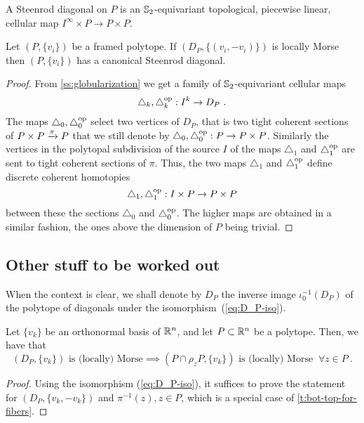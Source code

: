 \begin{definition}
	A Steenrod diagonal on $P$ is an $\mathbb{S}_2$-equivariant topological, piecewise linear, cellular map $I^\infty \times P \to P \times P$.
\end{definition}

\begin{theorem}
	Let $(P,\{v_i\})$ be a framed polytope.
	If $(D_P, \{(v_i,-v_i)\})$ is locally Morse then
	$(P,\{v_i\})$ has a canonical Steenrod diagonal.
\end{theorem}

\begin{proof}
	From \cref{ss:globularization} we get a family of $\mathbb{S}_2$-equivariant cellular maps
	\[
	\triangle_k, \triangle_k^{\mathrm{op}} : I^k \to D_P \ .
	\]
	The maps $\triangle_0, \triangle_0^{\mathrm{op}}$ select two vertices of $D_P$, that is two tight coherent sections of $P\times P \xrightarrow{\pi} P$ that we still denote by $\triangle_0, \triangle_0^{\mathrm{op}} : P \to P\times P$.
	Similarly the vertices in the polytopal subdivision of the source $I$ of the maps $\triangle_1$ and $\triangle_1^{\mathrm{op}}$ are sent to tight coherent sections of $\pi$.
	Thus, the two maps $\triangle_1$ and $\triangle_1^{\mathrm{op}}$ define discrete coherent homotopies
	\[
	\triangle_1, \triangle_1^{\mathrm{op}} : I\times P \to P \times P
	\]
	between these the sections $\triangle_0$ and $\triangle_0^{\mathrm{op}}$.
	The higher maps are obtained in a similar fashion, the ones above the dimension of $P$ being trivial.
\end{proof}



\subsection{Other stuff to be worked out}

When the context is clear, we shall denote by $D_P$ the inverse image $\iota_0^{-1}(D_P)$ of the polytope of diagonals under the isomorphism~(\ref{eq:D_P-iso}).

\begin{lemma} \label{l:bot-top-for-DP}
	Let $\{v_k\}$ be an orthonormal basis of $\mathbb{R}^n$, and let $P\subset \mathbb{R}^n$ be a polytope.
	Then, we have that
	\[
	(D_P,\{v_k\}) \text{ is (locally) Morse}
	\implies (P\cap \rho_z P,\{v_k\}) \text{ is (locally) Morse }  \ \forall z \in P \ .
	\]
\end{lemma}

\begin{proof}
	Using the isomorphism (\ref{eq:D_P-iso}), it suffices to prove the statement for $(D_P,\{v_k,-v_k\})$ and $\pi^{-1}(z), z \in P$, which is a special case of \cref{t:bot-top-for-fibers}.
\end{proof}

